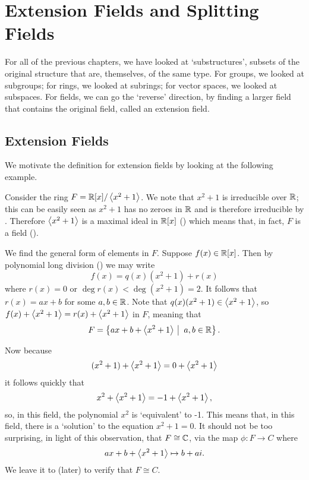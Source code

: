 \chapter{Extension Fields and Splitting Fields}
For all of the previous chapters, we have looked at `substructures', subsets of the original structure that are, themselves, of the same type. For groups, we looked at subgroups; for rings, we looked at subrings; for vector spaces, we looked at subspaces. For fields, we can go the `reverse' direction, by finding a larger field that contains the original field, called an extension field.

\section{Extension Fields}
We motivate the definition for extension fields by looking at the following example.

\begin{example}\label{example-R[x]-mod-x^2+1-is-isomorphic-to-C}
    Consider the ring $F = \mathbb{R}[x]/\left\langle x^2+1\right\rangle$. We note that $x^2 + 1$ is irreducible over $\mathbb{R}$; this can be easily seen as $x^2+1$ has no zeroes in $\mathbb{R}$ and is therefore irreducible by . Therefore $\left\langle x^2+1\right\rangle$ is a maximal ideal in $\mathbb{R}[x]$ () which means that, in fact, $F$ is a field ().

    We find the general form of elements in $F$. Suppose $f(x) \in \mathbb{R}[x]$. Then by polynomial long division () we may write
    \[
        f(x) = q(x)(x^2+1) + r(x)
    \]
    where $r(x) = 0$ or $\deg r(x) < \deg(x^2+1) = 2$. It follows that $r(x) = ax + b$ for some $a, b \in \mathbb{R}$. Note that $q(x)(x^2+1) \in \left\langle x^2+1\right\rangle$, so $f(x) + \left\langle x^2+1\right\rangle = r(x) + \left\langle x^2+1\right\rangle$ in $F$, meaning that
    \[
        F = \left\{ax + b + \princ{x^2+1} \vert a,b\in \R\right\}.
    \]

    Now because
    \[
        (x^2 + 1) + \left\langle x^2 + 1\right\rangle = 0 + \left\langle x^2+1\right\rangle
    \]
    it follows quickly that
    \[
        x^2 + \left\langle x^2 + 1\right\rangle = -1 + \left\langle x^2+1\right\rangle,
    \]
    so, in this field, the polynomial $x^2$ is `equivalent' to -1. This means that, in this field, there is a `solution' to the equation $x^2 + 1 = 0$. It should not be too surprising, in light of this observation, that $F \cong \mathbb{C}$, via the map $\phi: F \to C$ where
    \[
        ax + b + \left\langle x^2 + 1\right\rangle \mapsto b + ai.
    \]
    We leave it to  (later) to verify that $F \cong C$.
\end{example}


